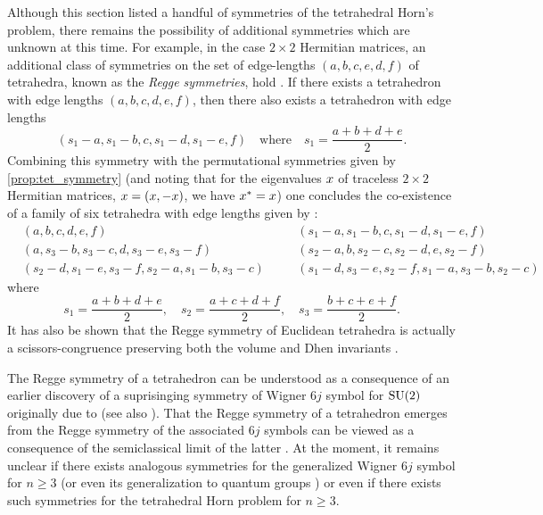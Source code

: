 \documentclass[notitlepage, 10pt]{article}
\begin{document}
\begin{rem}
    Although this section listed a handful of symmetries of the tetrahedral Horn's problem, there remains the possibility of additional symmetries which are unknown at this time.
    For example, in the case $2\times 2$ Hermitian matrices, an additional class of symmetries on the set of edge-lengths $(a,b,c,e,d,f)$ of tetrahedra, known as the \textit{Regge symmetries}, hold \cite[Theorem 1.1]{akopyan2019regge,morozov2018new,boalch2007regge,ponzano1968semiclassical}.
    If there exists a tetrahedron with edge lengths $(a,b,c,d,e,f)$, then there also exists a tetrahedron with edge lengths
    \begin{equation}
        (s_1-a,s_1-b,c,s_1-d,s_1-e,f) \quad \text{where} \quad s_1 = \frac{a+b+d+e}{2}.
    \end{equation}
    Combining this symmetry with the permutational symmetries given by \cref{prop:tet_symmetry} (and noting that for the eigenvalues $x$ of traceless $2 \times 2$ Hermitian matrices, $x = (x, -x)$, we have $x^{*} = x$) one concludes the co-existence of a family of six tetrahedra with edge lengths given by \cite[Chapter 9]{varshalovich1988quantum}:
    \begin{equation}
        \begin{alignedat}{2}
            &(a,b,c,d,e,f) \quad
            &&(s_1-a,s_1-b,c,s_1-d,s_1-e,f) \\
            &(a,s_3-b,s_3-c,d,s_3-e,s_3-f) \quad
            &&(s_2-a,b,s_2-c,s_2-d,e,s_2-f) \\
            &(s_2-d,s_1-e,s_3-f,s_2-a,s_1-b,s_3-c) \quad
            &&(s_1-d,s_3-e,s_2-f,s_1-a,s_3-b,s_2-c)
        \end{alignedat}
    \end{equation}
    where
    \begin{equation}
        s_1 = \frac{a+b+d+e}{2}, \quad
        s_2 = \frac{a+c+d+f}{2}, \quad
        s_3 = \frac{b+c+e+f}{2}.
    \end{equation}
    It has also be shown that the Regge symmetry of Euclidean tetrahedra is actually a scissors-congruence preserving both the volume and Dhen invariants \cite{akopyan2019regge}.
\end{rem}
\begin{rem}
    The Regge symmetry of a tetrahedron can be understood as a consequence of an earlier discovery of a suprisinging symmetry of Wigner $6j$ symbol for $\operatorname{SU}(2)$ originally due to \citeauthor{regge1959symmetry} \cite{regge1959symmetry} (see also \cite{boalch2007regge}).
    That the Regge symmetry of a tetrahedron emerges from the Regge symmetry of the associated $6j$ symbols can be viewed as a consequence of the semiclassical limit of the latter \cite{ponzano1968semiclassical,roberts1999classical}.
    At the moment, it remains unclear if there exists analogous symmetries for the generalized Wigner $6j$ symbol for $n \geq 3$ (or even its generalization to quantum groups \cite{morozov2018new}) or even if there exists such symmetries for the tetrahedral Horn problem for $n \geq 3$.
\end{rem}
\end{document}

